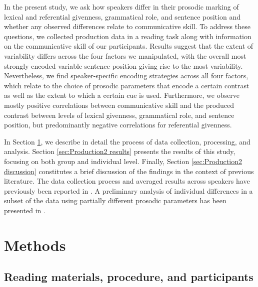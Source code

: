 In the present study, we ask how speakers differ in their prosodic marking of lexical and referential givenness, grammatical role, and sentence position and whether any observed differences relate to communicative skill. To address these questions, we collected production data in a reading task along with information on the communicative skill of our participants. Results suggest that the extent of variability differs across the four factors we manipulated, with the overall most strongly encoded variable sentence position giving rise to the most variability. Nevertheless, we find speaker-specific encoding strategies across all four factors, which relate to the choice of prosodic parameters that encode a certain contrast as well as the extent to which a certain cue is used. Furthermore, we observe mostly positive correlations between communicative skill and the produced contrast between levels of lexical givenness, grammatical role, and sentence position, but predominantly negative correlations for referential givenness.

In Section \ref{sec:Production2 methods}, we describe in detail the process of data collection, processing, and analysis. Section \ref{sec:Production2 results} presents the results of this study, focusing on both group and individual level. Finally, Section \ref{sec:Production2 discussion} constitutes a brief discussion of the findings in the context of previous literature. The data collection process and averaged results across speakers have previously been reported in \citet{baumannBoostingInhibitingHow2024}. A preliminary analysis of individual differences in a subset of the data using partially different prosodic parameters has been presented in \citet{lorenzenDoesCommunicativeSkill2024}.

\section{Methods} \label{sec:Production2 methods}

\subsection{Reading materials, procedure, and participants}

